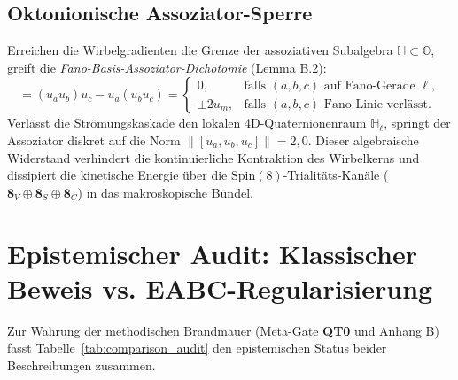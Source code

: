 \documentclass[11pt,a4paper]{article}
\theoremstyle{remark}
\begin{document}
\subsection{Oktonionische Assoziator-Sperre}
Erreichen die Wirbelgradienten die Grenze der assoziativen Subalgebra $\mathbb{H} \subset \mathbb{O}$, greift die \emph{Fano-Basis-Assoziator-Dichotomie} (Lemma B.2):
\begin{equation}
[u_a, u_b, u_c] = (u_a u_b) u_c - u_a (u_b u_c) = 
\begin{cases}
0, & \text{falls } (a,b,c) \text{ auf Fano-Gerade } \ell, \\
\pm 2 u_m, & \text{falls } (a,b,c) \text{ Fano-Linie verlässt}.
\end{cases}
\end{equation}
Verlässt die Strömungskaskade den lokalen 4D-Quaternionenraum $\mathbb{H}_\ell$, springt der Assoziator diskret auf die Norm $\|[u_a, u_b, u_c]\| = 2{,}0$. Dieser algebraische Widerstand verhindert die kontinuierliche Kontraktion des Wirbelkerns und dissipiert die kinetische Energie über die $\mathrm{Spin}(8)$-Trialitäts-Kanäle ($\mathbf{8}_V \oplus \mathbf{8}_S \oplus \mathbf{8}_C$) in das makroskopische Bündel.

\section{Epistemischer Audit: Klassischer Beweis vs. EABC-Regularisierung}

Zur Wahrung der methodischen Brandmauer (Meta-Gate \textbf{QT0} und Anhang B) fasst Tabelle~\ref{tab:comparison_audit} den epistemischen Status beider Beschreibungen zusammen.
\end{document}
